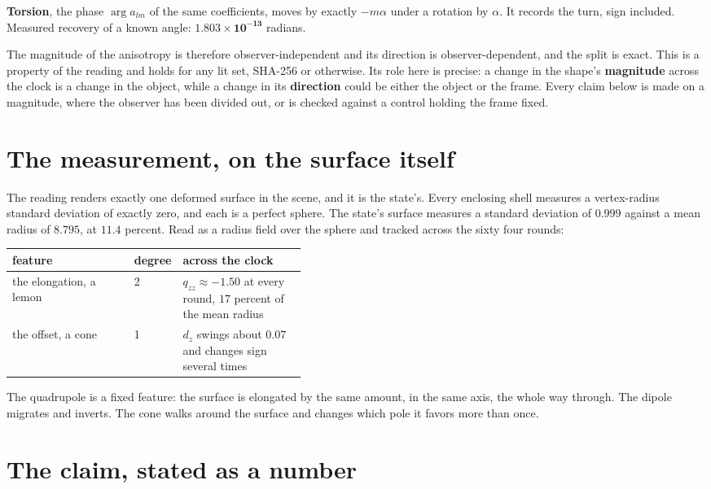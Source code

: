 \textbf{Torsion}, the phase \(\arg a_{lm}\) of the same coefficients, moves by exactly \(-m\alpha\) under a rotation by \(\alpha\). It records the turn, sign included. Measured recovery of a known angle: \(\mathbf{1.803 \times 10^{-13}}\) radians.

The magnitude of the anisotropy is therefore observer-independent and its direction is observer-dependent, and the split is exact. This is a property of the reading and holds for any lit set, SHA-256 or otherwise. Its role here is precise: a change in the shape's \textbf{magnitude} across the clock is a change in the object, while a change in its \textbf{direction} could be either the object or the frame. Every claim below is made on a magnitude, where the observer has been divided out, or is checked against a control holding the frame fixed.

\section{The measurement, on the surface itself}

The reading renders exactly one deformed surface in the scene, and it is the state's. Every enclosing shell measures a vertex-radius standard deviation of exactly zero, and each is a perfect sphere. The state's surface measures a standard deviation of \(0.999\) against a mean radius of \(8.795\), at \(11.4\) percent. Read as a radius field over the sphere and tracked across the sixty four rounds:

\begin{center}
\begin{tabular}{@{}llp{0.42\linewidth}@{}}
\toprule
feature & degree & across the clock \\
\midrule
the elongation, a lemon & 2 & \(q_{zz} \approx -1.50\) at every round, \(17\) percent of the mean radius \\
the offset, a cone & 1 & \(d_z\) swings about \(0.07\) and changes sign several times \\
\bottomrule
\end{tabular}
\end{center}

The quadrupole is a fixed feature: the surface is elongated by the same amount, in the same axis, the whole way through. The dipole migrates and inverts. The cone walks around the surface and changes which pole it favors more than once.

\section{The claim, stated as a number}

